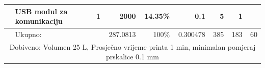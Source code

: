 \documentclass[12pt]{article}
\begin{document}
\begin{landscape}
\begin{table}[htbp]
\begin{tabular}{ccccccccc}
\cmidrule{5-5}          & \multicolumn{1}{l}{USB modul za komunikaciju} & \multicolumn{1}{r}{1} & \multicolumn{1}{r}{2000} & \multicolumn{1}{r}{14.35\%} & \multicolumn{1}{r}{0.1} & \multicolumn{1}{r}{5} & \multicolumn{1}{r}{1} &  \\
    \midrule
          & \multicolumn{1}{l}{Ukupno:} &       & \multicolumn{1}{r}{287.0813} & \multicolumn{1}{r}{100\%} & \multicolumn{1}{r}{0.300478} & \multicolumn{1}{r}{385} & \multicolumn{1}{r}{183} & \multicolumn{1}{r}{60} \\
    \midrule
    \multicolumn{9}{c}{Dobiveno: Volumen 25 L, Prosječno vrijeme printa 1 min, minimalan pomjeraj prskalice 0.1 mm} \\
    \bottomrule
    \end{tabular}%
  \label{tab:addlabel}%
\end{table}%


\end{landscape}
\end{document}
